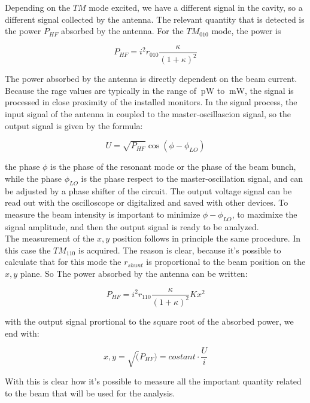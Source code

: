 Depending on the $TM$ mode excited, we have a different signal in the cavity, so a different signal collected by the antenna. The relevant quantity that is detected is the power $P_{HF}$ absorbed by the antenna. For the $TM_{010}$ mode, the power is 

\begin{equation}
P_{HF} = i^{2} r_{010} \frac{\kappa}{(1 + \kappa)^{2}}
\end{equation}

The power absorbed by the antenna is directly dependent on the beam current. Because the rage values are typically in the range of $\SI{}{\pico \watt}$ to $\SI{}{\milli \watt }$, the signal is processed in close proximity of the installed monitors. In the signal process, the input signal of the antenna in coupled to the master-oscillascion signal, so the output signal is given by the formula:

\begin{equation}
U = \sqrt{P_{HF}} \cos(\phi - \phi_{LO})
\end{equation}

the phase $\phi$ is the phase of the resonant mode or the phase of the beam bunch, while the phase $\phi_{LO}$ is the phase respect to the master-oscillation signal, and can be adjusted by a phase shifter of the circuit. The output voltage signal can be read out with the oscilloscope or digitalized and saved with other devices. To measure the beam intensity is important to minimize $\phi - \phi_{LO}$, to maximixe the signal amplitude, and then the output signal is ready to be analyzed. \\
The measurement of the $x,y$ position follows in principle the same procedure. In this case the $TM_{110}$ is acquired. The reason is clear, because it's possible to calculate that for this mode the $r_{shunt}$ is proportional to the beam position on the $x,y$ plane. So The power absorbed by the antenna can be written:

\begin{equation}
P_{HF} = i^{2} r_{110} \frac{\kappa}{(1 + \kappa)^{2}} K x^{2}
\end{equation} 
 
with the output signal prortional to the square root of the absorbed power, we end with:

\begin{equation}
x,y = \sqrt(P_{HF}) = costant \cdot \frac{U}{i}  
\end{equation} 

With this is clear how it's possible to measure all the important quantity related to the beam that will be used for the analysis.

